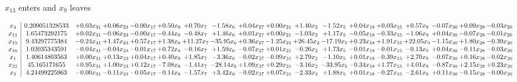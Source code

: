 \documentclass[9pt]{article}
\begin{document}
 $ x_{13} $ enters and $ x_{9} $ leaves 

 \[\begin{array}{c| c c@{\hskip 2pt} c@{\hskip 2pt} c@{\hskip 2pt} c@{\hskip 2pt} c@{\hskip 2pt} c@{\hskip 2pt} c@{\hskip 2pt} c@{\hskip 2pt} c@{\hskip 2pt} c@{\hskip 2pt} c@{\hskip 2pt} c@{\hskip 2pt} c@{\hskip 2pt} c@{\hskip 2pt} c@{\hskip 2pt} c@{\hskip 2pt} }
 x_{4}   &  0.209051328533 & +  0.03 x_{31} & +  0.06 x_{23} & -0.00 x_{17} & +  0.50 x_{8} & +  0.70 x_{7} & -1.58 x_{6} & +  0.04 x_{27} & +  0.00 x_{21} & +  1.40 x_{2} & -1.52 x_{5} & +  0.04 x_{18} & +  0.03 x_{15} & +  0.57 x_{9} & -0.07 x_{30} & +  0.09 x_{28} & -0.03 x_{20}\\
 x_{11}   &  1.65473292175 & +  0.02 x_{31} & -0.06 x_{23} & -0.00 x_{17} & -0.44 x_{8} & -0.48 x_{7} & +  1.46 x_{6} & +  0.01 x_{27} & +  0.00 x_{21} & -1.03 x_{2} & +  1.17 x_{5} & -0.05 x_{18} & -0.33 x_{15} & -1.06 x_{9} & +  0.04 x_{30} & -0.07 x_{28} & -0.01 x_{20}\\
 x_{19}   &  9.43297775384 & -0.24 x_{31} & +  1.47 x_{23} & +  0.57 x_{17} & +  1.38 x_{8} & + 11.27 x_{7} & -35.95 x_{6} & +  0.36 x_{27} & -1.25 x_{21} & + 26.45 x_{2} & -17.19 x_{5} & +  0.23 x_{18} & +  1.91 x_{15} & + 22.05 x_{9} & -1.15 x_{30} & +  1.80 x_{28} & -0.39 x_{20}\\
 x_{16}   &  1.02035343591 & -0.04 x_{31} & -0.04 x_{23} & -0.01 x_{17} & +  0.72 x_{8} & -0.16 x_{7} & +  1.59 x_{6} & -0.07 x_{27} & +  0.01 x_{21} & -0.26 x_{2} & +  1.73 x_{5} & -0.01 x_{18} & -0.01 x_{15} & -0.13 x_{9} & +  0.04 x_{30} & -0.11 x_{28} & -0.03 x_{20}\\
 x_{1}   &  1.40614803563 & +  0.00 x_{31} & +  0.13 x_{23} & +  0.04 x_{17} & +  0.40 x_{8} & +  1.85 x_{7} & -3.36 x_{6} & -0.02 x_{27} & -0.09 x_{21} & +  2.79 x_{2} & -1.10 x_{5} & +  0.01 x_{18} & -0.39 x_{15} & +  2.70 x_{9} & -0.07 x_{30} & +  0.16 x_{28} & -0.02 x_{20}\\
 x_{22}   &  45.165171655 & +  0.95 x_{31} & +  1.00 x_{23} & +  0.12 x_{17} & -7.08 x_{8} & -1.41 x_{7} & -28.14 x_{6} & +  1.09 x_{27} & +  0.29 x_{21} & -3.16 x_{2} & -33.95 x_{5} & -0.34 x_{18} & +  1.77 x_{15} & +  4.01 x_{9} & -0.87 x_{30} & +  2.15 x_{28} & +  0.23 x_{20}\\
 x_{3}   &  4.24499225963 & -0.00 x_{31} & -0.11 x_{23} & -0.05 x_{17} & -0.14 x_{8} & -1.57 x_{7} & +  3.42 x_{6} & -0.02 x_{27} & +  0.07 x_{21} & -2.33 x_{2} & +  1.88 x_{5} & +  0.01 x_{18} & -0.27 x_{15} & -2.61 x_{9} & +  0.11 x_{30} & -0.15 x_{28} & -0.00 x_{20}\\

\end{array}\]
\end{document}
